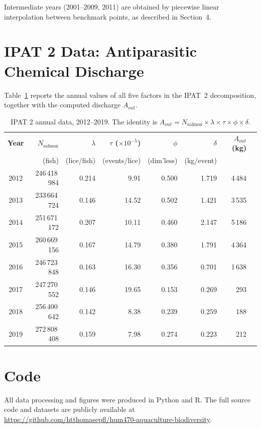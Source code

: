 \documentclass[12pt, a4paper]{report}
\begin{document}
\noindent Intermediate years (2001--2009, 2011) are obtained by 
piecewise linear interpolation between benchmark points, as described 
in Section~4.

\section{IPAT 2 Data: Antiparasitic Chemical Discharge}

Table~\ref{tab:ipat2data} reports the annual values of all five 
factors in the IPAT~2 decomposition, together with the computed 
discharge $A_{out}$.

\begin{table}[H]
\centering
\caption{IPAT 2 annual data, 2012--2019.
The identity is $A_{out} = N_{\text{salmon}} \times \lambda \times \tau \times \phi \times \delta$.}
\begin{tabular}{crrrrrrr}
\hline
\textbf{Year}
  & \textbf{$N_{\text{salmon}}$}
  & \textbf{$\lambda$}
  & \textbf{$\tau$ ($\times 10^{-5}$)}
  & \textbf{$\phi$}
  & \textbf{$\delta$}
  & \textbf{$A_{out}$ (kg)} \\
  & (fish)
  & (lice/fish)
  & (events/lice)
  & (dim'less)
  & (kg/event)
  & \\
\hline
2012 & 246\,418\,984 & 0.214 &  9.91 & 0.500 & 1.719 & 4\,484 \\
2013 & 233\,664\,724 & 0.146 & 14.52 & 0.502 & 1.421 & 3\,535 \\
2014 & 251\,671\,172 & 0.207 & 10.11 & 0.460 & 2.147 & 5\,186 \\
2015 & 260\,669\,156 & 0.167 & 14.79 & 0.380 & 1.791 & 4\,364 \\
2016 & 246\,723\,848 & 0.163 & 16.30 & 0.356 & 0.701 & 1\,638 \\
2017 & 247\,270\,552 & 0.146 & 19.65 & 0.153 & 0.269 &   293 \\
2018 & 256\,400\,642 & 0.142 &  8.38 & 0.239 & 0.259 &   188 \\
2019 & 272\,808\,408 & 0.159 &  7.98 & 0.274 & 0.223 &   212 \\
\hline
\end{tabular}
\label{tab:ipat2data}
\end{table}

\section{Code}

All data processing and figures were produced in Python and R.
The full source code and datasets are publicly available at
\url{https://github.com/htthomasepfl/hum470-aquaculture-biodiversity}. 
\end{document}

